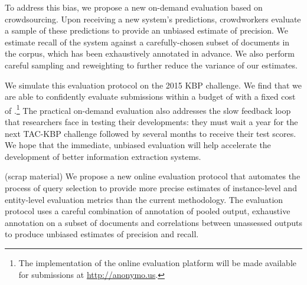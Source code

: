 

To address this bias, we propose a new on-demand evaluation based on crowdsourcing.
Upon receiving a new system's predictions,
crowdworkers evaluate a sample of these predictions to provide an unbiased estimate of precision.
We estimate recall of the system against a carefully-chosen subset of documents in the corpus,
which has been exhaustively annotated in advance.
We also perform careful sampling and reweighting to further reduce the variance of our estimates.

We simulate this evaluation protocol on the 2015  KBP challenge.
We find that we are able to confidently evaluate submissions within a budget of  with a fixed cost of  .\footnote{The implementation of the online evaluation platform will be made available for submissions at \url{http://anonymo.us}.}
The practical on-demand evaluation also addresses
the slow feedback loop that researchers face in testing their developments: they
must wait a year for the next TAC-KBP challenge followed by several months to
receive their test scores.  We hope that the immediate, unbiased evaluation
will help accelerate the development of better information extraction systems.

(scrap material)
We propose a new online evaluation protocol that automates the process of query selection to provide more precise estimates of instance-level and entity-level evaluation metrics than the current methodology.
The evaluation protocol uses a careful combination of annotation of pooled output, exhaustive annotation on a subset of documents and correlations between unassessed outputs to produce unbiased estimates of precision and recall.

